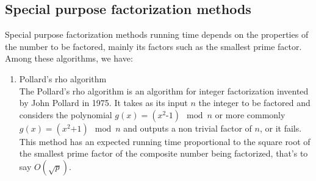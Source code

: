 \documentclass[sigconf,balance=false]{acmart}
\begin{document}
\subsection{Special purpose factorization methods}
Special purpose factorization methods running time depends on the properties of the number to be factored, mainly its factors such as the smallest prime factor. Among these algorithms, we have:
\begin{enumerate}
\item Pollard's rho algorithm \\
The Pollard's rho algorithm is an algorithm for integer factorization invented by John Pollard in 1975. 
It takes as its input $n$ the integer to be factored and considers the polynomial $g\left(x\right)= \left(x^2 \text{-}1 \right) \mod n $ or more commonly $g\left(x\right)= \left(x^2 \text{+}1 \right) \mod n $ and outputs a non trivial factor of $n$, or it fails.\\
This method has an expected running time proportional to the square root of the smallest prime factor of the composite number being factorized, that's to say $\displaystyle O\left(\sqrt{p}\right)$.\\


\end{enumerate}
\end{document}
